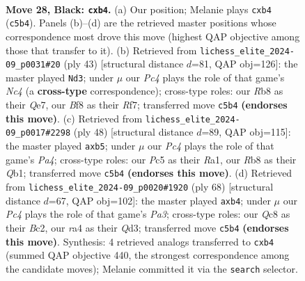 \documentclass[11pt]{article}
\begin{document}
\clearpage

\begin{figure}[p]\centering
\begin{subfigure}{0.46\textwidth}\centering
\resizebox{\linewidth}{!}{%
\newchessgame
\chessboard[
  setfen={1rq2b2/n3rk2/p2p1pp1/2pP3p/RP2P3/5R1P/3BNPP1/1Q4K1 b - - 1 28},
  showmover=false,
  pgfstyle=straightmove, color=movearrow, markmove={c5-b4}
]}
\caption{}
\end{subfigure}\hfill
\begin{subfigure}{0.46\textwidth}\centering
\resizebox{\linewidth}{!}{%
\newchessgame
\chessboard[
  setfen={3r2k1/4qr1p/bpp2pp1/p1nP4/P1p1PB2/2P1R3/1P1NQ1PP/R5K1 b - - 0 22},
  showmover=false,
  pgfstyle=straightmove, color=movearrow, markmove={c5-d3}
]}
\caption{}
\end{subfigure}
\\[4pt]
\begin{subfigure}{0.46\textwidth}\centering
\resizebox{\linewidth}{!}{%
\newchessgame
\chessboard[
  setfen={4k2r/1rq2p2/p2ppb2/1p5p/P1n2NpP/4P3/2P2PPB/RQ1R2K1 w k - 0 25},
  showmover=false,
  pgfstyle=straightmove, color=movearrow, markmove={a4-b5}
]}
\caption{}
\end{subfigure}\hfill
\begin{subfigure}{0.46\textwidth}\centering
\resizebox{\linewidth}{!}{%
\newchessgame
\chessboard[
  setfen={2br4/5qk1/1p4pr/p2Ppp1p/1pP4P/P2Q2R1/2B2PP1/1R4K1 w - - 0 35},
  showmover=false,
  pgfstyle=straightmove, color=movearrow, markmove={a3-b4}
]}
\caption{}
\end{subfigure}
\caption{\textbf{Move 28, Black: \texttt{cxb4}.} (a) Our position; Melanie plays \texttt{cxb4} (\texttt{c5b4}). Panels (b)--(d) are the retrieved master positions whose correspondence most drove this move (highest QAP objective among those that transfer to it). (b) Retrieved from \texttt{lichess\_elite\_2024-09\_p0031\#20} (ply 43) [structural distance $d$=81, QAP obj=126]: the master played \texttt{Nd3}; under $\mu$ our \emph{Pc4} plays the role of that game's \emph{Nc4} (a \textbf{cross-type} correspondence); cross-type roles: our \emph{R}b8 as their \emph{Q}e7, our \emph{B}f8 as their \emph{R}f7; transferred move \texttt{c5b4} \textbf{(endorses this move)}. (c) Retrieved from \texttt{lichess\_elite\_2024-09\_p0017\#2298} (ply 48) [structural distance $d$=89, QAP obj=115]: the master played \texttt{axb5}; under $\mu$ our \emph{Pc4} plays the role of that game's \emph{Pa4}; cross-type roles: our \emph{P}c5 as their \emph{R}a1, our \emph{R}b8 as their \emph{Q}b1; transferred move \texttt{c5b4} \textbf{(endorses this move)}. (d) Retrieved from \texttt{lichess\_elite\_2024-09\_p0020\#1920} (ply 68) [structural distance $d$=67, QAP obj=102]: the master played \texttt{axb4}; under $\mu$ our \emph{Pc4} plays the role of that game's \emph{Pa3}; cross-type roles: our \emph{Q}c8 as their \emph{B}c2, our \emph{r}a4 as their \emph{Q}d3; transferred move \texttt{c5b4} \textbf{(endorses this move)}. Synthesis: 4 retrieved analogs transferred to \texttt{cxb4} (summed QAP objective 440, the strongest correspondence among the candidate moves); Melanie committed it via the \texttt{search} selector.}
\label{fig:thought-m55}
\end{figure}
\end{document}
